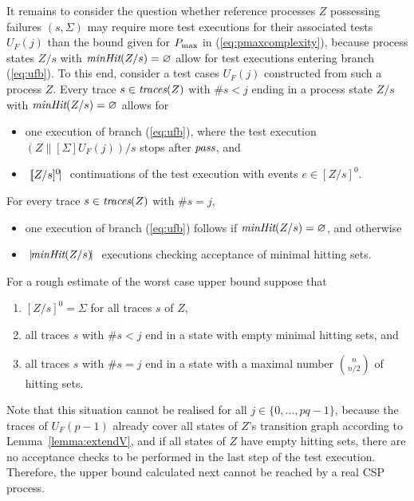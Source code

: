 It remains to 
consider the question whether reference processes $Z$ possessing failures $(s,\Sigma)$
may require more test executions for their associated tests $U_F(j)$ than the bound
given for $P_\text{max}$ in (\ref{eq:pmaxcomplexity}), because process states $Z/s$ with  
$\text{\it minHit}(Z/s)=\varnothing$ allow for test executions entering branch (\ref{eq:ufb}).
To this end, consider a test cases $U_F(j)$ constructed from such a process $Z$. Every trace
$s\in\text{\it traces}(Z)$ with $\#s<j$ ending in a process state $Z/s$ with $\text{\it minHit}(Z/s)=\varnothing$ allows for 
%
\begin{itemize}
\item one execution of branch (\ref{eq:ufb}), where the test execution 
$(Z\parallel[\Sigma]U_F(j))/s$ stops after ${\text{\it pass}}$, and
\item ${~|\! [Z/s]^0\!|~}$   continuations of the test execution with events $e\in [Z/s]^0$. 
\end{itemize}
%
For every trace $s\in\text{\it traces}(Z)$ with $\#s=j$,
%
\begin{itemize}
\item one execution of branch (\ref{eq:ufb}) follows if 
$\text{\it minHit}(Z/s)=\varnothing$, and otherwise
\item ${~|\! \text{\it minHit}(Z/s)\!|~}$ executions checking acceptance of minimal hitting sets. 
\end{itemize}
%
For a rough estimate of the worst case upper bound suppose that
%
\begin{enumerate}
\item $[Z/s]^0 = \Sigma$ for all traces $s$ of $Z$,
\item all traces $s$ with $\#s<j$ end in a state with empty minimal hitting sets, and
\item all traces $s$ with $\#s=j$ end in a state with a maximal number $\binom{n}{n/2}$
 of hitting sets.
\end{enumerate}
%
Note that this situation cannot be realised for all $j\in\{0,\dots,pq-1\}$, because
the traces of 
$U_F(p-1)$ already cover all states of $Z$'s transition graph according to Lemma~\ref{lemma:extendV}, and if all states of $Z$ have empty hitting sets, there are no acceptance checks to be performed in the last step of the test execution. Therefore, the   upper bound calculated next cannot be reached by a real CSP process.

